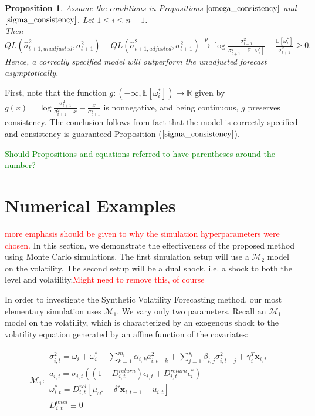 \documentclass[11pt]{article}
\newcommand{\x}{\textbf{x}}
\def\mbf#1{\mathbf{#1}} %
\def\mc#1{\mathcal{#1}} %
\def\E{\mathbb{E}} %
\def\mc#1{\mathcal{#1}}
\newtheorem{prop}{Proposition}
\theoremstyle{definition}
\newenvironment{proof-of-proposition}[1][{}]{\noindent{\bf
    Proof of Proposition {#1}}
  \hspace*{.5em}}{\qed\bigskip\\}
\begin{document}
\begin{prop}\label{asymptotic_consistency}
Assume the conditions in Propositions $\ref{omega_consistency}$ and $\ref{sigma_consistency}$.  Let $1\leq i\leq n+1$.\\
  Then $QL(\hat\sigma_{t+1, unadjusted}^{2},\sigma^{2}_{t+1})-QL(\hat\sigma^{2}_{t+1, adjusted},\sigma^{2}_{t+1})\xrightarrow{p} \log{\frac{\sigma^{2}_{t+1}}{\sigma_{t+1}^{2}-\E[\omega_{i}^{*}]}} - \frac{\E[\omega_{i}^{*}]}{\sigma^{2}_{t+1}} \geq 0.$
Hence, a correctly specified model will outperform the unadjusted forecast asymptotically.
\end{prop}

\begin{proof-of-proposition}
  First, note that the function $g:(-\infty,\E[\omega_{i}^{*}])\rightarrow \mathbb{R}$ given by $g(x) = \log{\frac{\sigma^{2}_{t+1}}{\sigma_{t+1}^{2}-x}} - \frac{x}{\sigma^{2}_{t+1}}$ is nonnegative, and being continuous, $g$ preserves consistency. The conclusion follows from fact that the model is correctly specified and consistency is guaranteed Proposition ($\ref{sigma_consistency}$). 
  
  \textcolor{green}{Should Propositions and equations referred to have parentheses around the number?}
\end{proof-of-proposition}

\section{Numerical Examples}

\textcolor{red}{more emphasis should be given to why the simulation hyperparameters were chosen.}
In this section, we demonstrate the effectiveness of the proposed method using Monte Carlo simulations.  The first simulation setup will use a $\mc{M}_{2}$ model on the volatility.  The second setup will be a dual shock, i.e. a shock to both the level and volatility.\textcolor{red}{Might need to remove this, of course} 

In order to investigate the Synthetic Volatility Forecasting method, our most elementary simulation uses $\mc{M}_1$.  We vary only two parameters.  Recall an $\mc{M}_1$ model on the volatility, which is characterized by an exogenous shock to the volatility equation generated by an affine function of the covariates:

  \begin{align*}
    \mc{M}_1 \colon \begin{array}{l}
       \sigma^{2}_{i,t} = \omega_{i} + \omega^{*}_i + \sum^{m_{i}}_{k=1}\alpha_{i,k}a^{2}_{i,t-k} + \sum_{j=1}^{s_{i}}\beta_{i,j}\sigma_{i,t-j}^{2} + \gamma_{i}^{T} \x_{i,t} \text{ }\\[.2cm]
       a_{i,t} = \sigma_{i,t}((1-D^{return}_{i,t})\epsilon_{i,t} + D^{return}_{i,t}\epsilon^{*}_{i})\\[.2cm]
      \omega_{i,t}^{*} = D^{vol}_{i,t}[\mu_{\omega^{*}}+\delta'\mbf{x}_{i, t-1}+ u_{i,t}]\\[.2cm]
      D^{level}_{i,t} \equiv 0
    \end{array}
    \end{align*}
\end{document}

